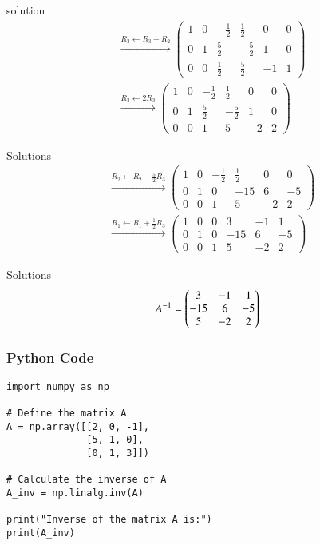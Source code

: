 \documentclass{beamer}
\begin{document}
\begin{frame}{solution}
\begin{align}
&\xrightarrow{R_3 \gets R_3 - R_2}
\left(
\begin{array}{ccc|ccc}
1 & 0 & -\frac{1}{2} & \frac{1}{2} & 0 & 0 \\
0 & 1 & \frac{5}{2} & -\frac{5}{2} & 1 & 0 \\
0 & 0 & \frac{1}{2} & \frac{5}{2} & -1 & 1
\end{array}
\right) \\[12pt]
&\xrightarrow{R_3 \gets 2R_3}
\left(
\begin{array}{ccc|ccc}
1 & 0 & -\frac{1}{2} & \frac{1}{2} & 0 & 0 \\
0 & 1 & \frac{5}{2} & -\frac{5}{2} & 1 & 0 \\
0 & 0 & 1 & 5 & -2 & 2
\end{array}
\right)
\end{align}
\end{frame}
\begin{frame}{Solutions}
\begin{align}
&\xrightarrow{R_2 \gets R_2 - \frac{5}{2}R_3}
\left(
\begin{array}{ccc|ccc}
1 & 0 & -\frac{1}{2} & \frac{1}{2} & 0 & 0 \\
0 & 1 & 0 & -15 & 6 & -5 \\
0 & 0 & 1 & 5 & -2 & 2
\end{array}
\right) \\[12pt]
&\xrightarrow{R_1 \gets R_1 + \frac{1}{2}R_3}
\left(
\begin{array}{ccc|ccc}
1 & 0 & 0 & 3 & -1 & 1 \\
0 & 1 & 0 & -15 & 6 & -5 \\
0 & 0 & 1 & 5 & -2 & 2
\end{array}
\right)
\end{align}
\end{frame}
\begin{frame}{Solutions}
  \begin{align}
A^{-1}
   =\begin{pmatrix}3 & -1 & 1
          \\
        -15 & 6 & -5
         \\
        5 & -2 & 2
\end{pmatrix}
\end{align}  
\end{frame}





\begin{frame}[fragile]
    \frametitle{Python Code}
    \begin{lstlisting}
import numpy as np

# Define the matrix A
A = np.array([[2, 0, -1],
              [5, 1, 0],
              [0, 1, 3]])

# Calculate the inverse of A
A_inv = np.linalg.inv(A)

print("Inverse of the matrix A is:")
print(A_inv)
\end{lstlisting}
\end{frame}
\end{document}
